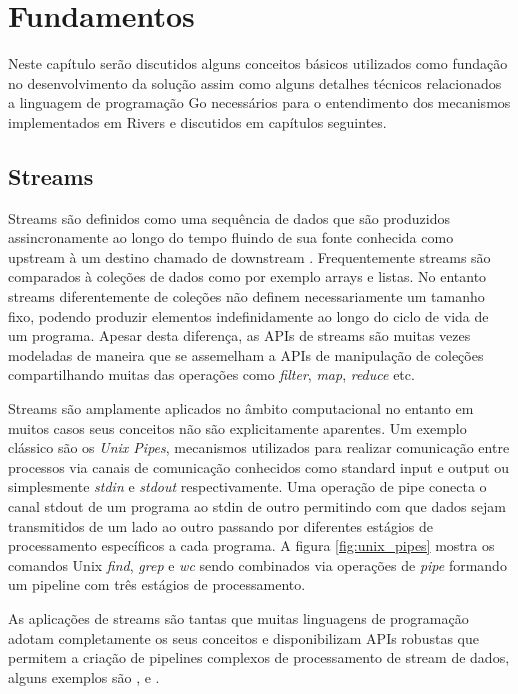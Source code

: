 \chapter{Fundamentos}
\label{cha:foundation}

Neste capítulo serão discutidos alguns conceitos básicos utilizados como fundação no desenvolvimento da solução assim como alguns detalhes técnicos relacionados a linguagem de programação Go necessários para o entendimento dos mecanismos implementados em Rivers e discutidos em capítulos seguintes.

\section{Streams}
\label{sec:streams}

Streams são definidos como uma sequência de dados que são produzidos assincronamente ao longo do tempo fluindo de sua fonte conhecida como upstream à um destino chamado de downstream \cite{article:tim:streams}. Frequentemente streams são comparados à coleções de dados como por exemplo arrays e listas. No entanto streams diferentemente de coleções não definem necessariamente um tamanho fixo, podendo produzir elementos indefinidamente ao longo do ciclo de vida de um programa. Apesar desta diferença, as APIs de streams são muitas vezes modeladas de maneira que se assemelham a APIs de manipulação de coleções compartilhando muitas das operações como \emph{filter}, \emph{map}, \emph{reduce} etc.

Streams são amplamente aplicados no âmbito computacional no entanto em muitos casos seus conceitos não são explicitamente aparentes. Um exemplo clássico são os \emph{Unix Pipes}, mecanismos utilizados para realizar comunicação entre processos \cite{book:tanenbaum:ipc} via canais de comunicação conhecidos como standard input e output ou simplesmente \emph{stdin} e \emph{stdout} respectivamente. Uma operação de pipe conecta o canal stdout de um programa ao stdin de outro permitindo com que dados sejam transmitidos de um lado ao outro passando por diferentes estágios de processamento específicos a cada programa. A figura \ref{fig:unix_pipes} mostra os comandos Unix \emph{find}, \emph{grep} e \emph{wc} sendo combinados via operações de \emph{pipe} formando um pipeline com três estágios de processamento.

As aplicações de streams são tantas que muitas linguagens de programação adotam completamente os seus conceitos e disponibilizam APIs robustas que permitem a criação de pipelines complexos de processamento de stream de dados, alguns exemplos são \cite{docs:nodejs:streams}, \cite{docs:haskell:streams} e \cite{docs:java8:streams}.

